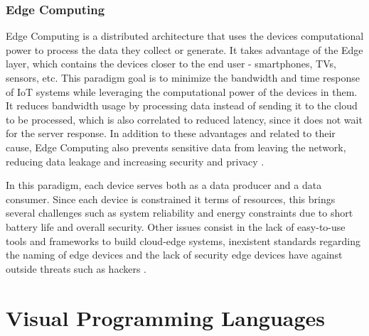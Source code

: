 \subsubsection{Edge Computing}\label{sec:edge_computing}

Edge Computing is a distributed architecture that uses the devices computational power to process the data they collect or generate. It takes advantage of the Edge layer, which contains the devices closer to the end user - smartphones, TVs, sensors, etc. This paradigm goal is to minimize the bandwidth and time response of IoT systems while leveraging the computational power of the devices in them. It reduces bandwidth usage by processing data instead of sending it to the cloud to be processed, which is also correlated to reduced latency, since it does not wait for the server response. In addition to these advantages and related to their cause, Edge Computing also prevents sensitive data from leaving the network, reducing data leakage and increasing security and privacy \cite{edge_computing, edge_computing_2019}.
\par In this paradigm, each device serves both as a data producer and a data consumer. Since each device is constrained it terms of resources, this brings several challenges such as system reliability and energy constraints due to short battery life and overall security. Other issues consist in the lack of easy-to-use tools and frameworks to build cloud-edge systems, inexistent standards regarding the naming of edge devices and the lack of security edge devices have against outside threats such as hackers \cite{promise_of_edge_computing}.

\section{Visual Programming Languages}\label{sec:background_vpl}

